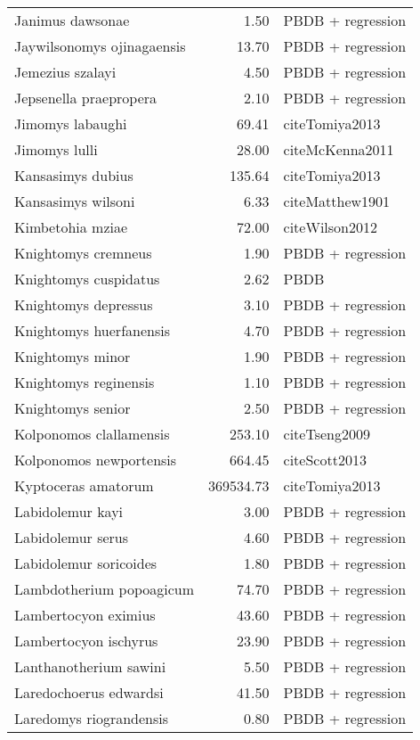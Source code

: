 \begin{table}[ht]
\begin{tabular}{lrl}
  Janimus dawsonae & 1.50 & PBDB + regression \\ 
  Jaywilsonomys ojinagaensis & 13.70 & PBDB + regression \\ 
  Jemezius szalayi & 4.50 & PBDB + regression \\ 
  Jepsenella praepropera & 2.10 & PBDB + regression \\ 
  Jimomys labaughi & 69.41 & cite{Tomiya2013} \\ 
  Jimomys lulli & 28.00 & cite{McKenna2011} \\ 
  Kansasimys dubius & 135.64 & cite{Tomiya2013} \\ 
  Kansasimys wilsoni & 6.33 & cite{Matthew1901} \\ 
  Kimbetohia mziae & 72.00 & cite{Wilson2012} \\ 
  Knightomys cremneus & 1.90 & PBDB + regression \\ 
  Knightomys cuspidatus & 2.62 & PBDB \\ 
  Knightomys depressus & 3.10 & PBDB + regression \\ 
  Knightomys huerfanensis & 4.70 & PBDB + regression \\ 
  Knightomys minor & 1.90 & PBDB + regression \\ 
  Knightomys reginensis & 1.10 & PBDB + regression \\ 
  Knightomys senior & 2.50 & PBDB + regression \\ 
  Kolponomos clallamensis & 253.10 & cite{Tseng2009} \\ 
  Kolponomos newportensis & 664.45 & cite{Scott2013} \\ 
  Kyptoceras amatorum & 369534.73 & cite{Tomiya2013} \\ 
  Labidolemur kayi & 3.00 & PBDB + regression \\ 
  Labidolemur serus & 4.60 & PBDB + regression \\ 
  Labidolemur soricoides & 1.80 & PBDB + regression \\ 
  Lambdotherium popoagicum & 74.70 & PBDB + regression \\ 
  Lambertocyon eximius & 43.60 & PBDB + regression \\ 
  Lambertocyon ischyrus & 23.90 & PBDB + regression \\ 
  Lanthanotherium sawini & 5.50 & PBDB + regression \\ 
  Laredochoerus edwardsi & 41.50 & PBDB + regression \\ 
  Laredomys riograndensis & 0.80 & PBDB + regression \\ 

\end{tabular}
\end{table}

